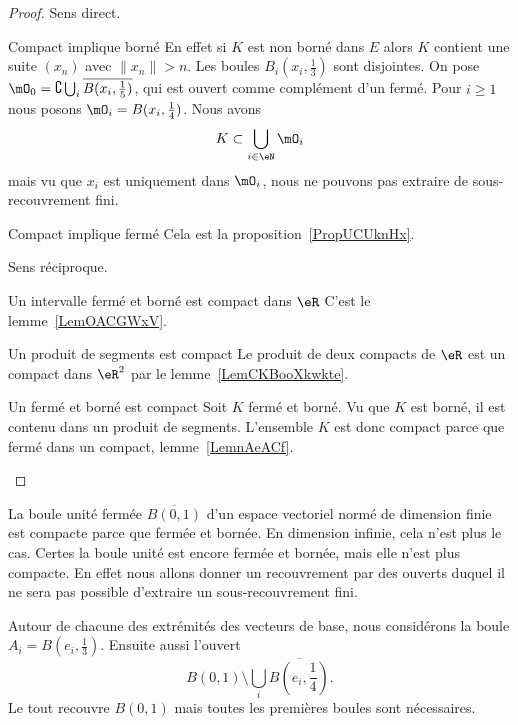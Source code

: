 \begin{proof}
    Sens direct.
    \begin{subproof}
    \item[Compact implique borné]
        En effet si \( K\) est non borné dans \( E\) alors \( K\) contient une suite \( (x_n)\) avec \( \| x_n \|>n\). Les boules \( B_i(x_i,\frac{ 1 }{3})\) sont disjointes. On pose \( \mO_0=\complement\bigcup_i\overline{ B(x_i,\frac{1}{ 5 }) }\), qui est ouvert comme complément d'un fermé. Pour \( i\geq 1\) nous posons \( \mO_i=B(x_i,\frac{1}{ 4 })\). Nous avons
        \begin{equation}
            K\subset\bigcup_{i\in \eN}\mO_i
        \end{equation}
        mais vu que \( x_i\) est uniquement dans \( \mO_i\), nous ne pouvons pas extraire de sous-recouvrement fini.
    \item[Compact implique fermé]
        Cela est la proposition~\ref{PropUCUknHx}.
    \end{subproof}
    Sens réciproque.
    \begin{subproof}
    \item[Un intervalle fermé et borné est compact dans \( \eR\)]
        C'est le lemme~\ref{LemOACGWxV}.
    \item[Un produit de segments est compact]
        Le produit de deux compacts de \( \eR\) est un compact dans \( \eR^2\) par le lemme~\ref{LemCKBooXkwkte}.
    \item[Un fermé et borné est compact]
        Soit \( K\) fermé et borné. Vu que \( K\) est borné, il est contenu dans un produit de segments. L'ensemble \( K\) est donc compact parce que fermé dans un compact, lemme~\ref{LemnAeACf}.
    \end{subproof}
\end{proof}

\begin{example}
    La boule unité fermée \( \overline{ B(0,1) }\) d'un espace vectoriel normé de dimension finie est compacte parce que fermée et bornée. En dimension infinie, cela n'est plus le cas. Certes la boule unité est encore fermée et bornée, mais elle n'est plus compacte. En effet nous allons donner un recouvrement par des ouverts duquel il ne sera pas possible d'extraire un sous-recouvrement fini.

    Autour de chacune des extrémités des vecteurs de base, nous considérons la boule \( A_i=B(e_i,\frac{1}{ 3 })\). Ensuite aussi l'ouvert
    \begin{equation}
        B(0,1)\setminus\bigcup_i\overline{ B(e_i,\frac{1}{ 4 })}.
    \end{equation}
    Le tout recouvre \( B(0,1)\) mais toutes les premières boules sont nécessaires.
\end{example}

